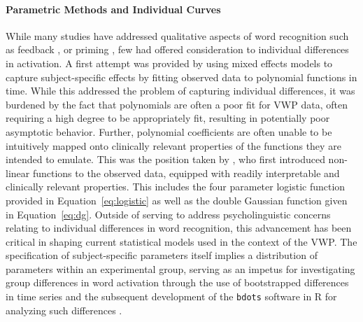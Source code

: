 \documentclass{article}
\newcommand{\xt}{\texttt}
\begin{document}
\paragraph{Parametric Methods and Individual Curves} While many studies have addressed qualitative aspects of word recognition such as feedback \citep{Magnuson2003}, or priming \citep{luce1998delayed}, few had offered consideration to individual differences in activation. A first attempt was provided by \citet{Mirman2008} using mixed effects models to capture subject-specific effects by fitting observed data to polynomial functions in time. While this addressed the problem of capturing individual differences, it was burdened by the fact that polynomials are often a poor fit for VWP data, often requiring a high degree to be appropriately fit, resulting in potentially poor asymptotic behavior. Further, polynomial coefficients are often unable to be intuitively mapped onto clinically relevant properties of the functions they are intended to emulate. This was the position taken by \citet{mcmurray2010individual}, who first introduced non-linear functions to the observed data, equipped with readily interpretable and clinically relevant properties. This includes the four parameter logistic function provided in Equation~\ref{eq:logistic} as well as the double Gaussian function given in Equation~\ref{eq:dg}. Outside of serving to address psycholinguistic concerns relating to individual differences in word recognition, this advancement has been critical in shaping current statistical models used in the context of the VWP. The specification of subject-specific parameters itself implies a distribution of parameters within an experimental group, serving as an impetus for investigating group differences in word activation through the use of bootstrapped differences in time series \citep{oleson2017detecting} and the subsequent development of the \xt{bdots} software in R for analyzing such differences \citep{seedorff2018bdots}.
\end{document}
